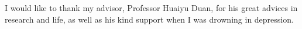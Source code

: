 

\begin{acknowledgments}
   \vspace{1.1in}
   I would like to thank my advisor, Professor Huaiyu Duan, for his great advices in research and life, as well as his kind support when I was drowning in depression.
\end{acknowledgments}
